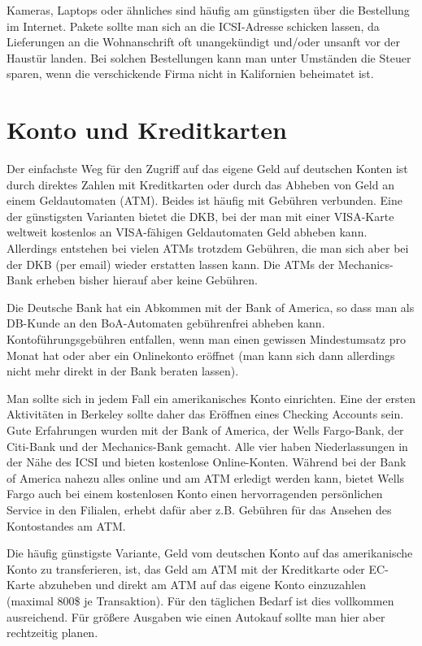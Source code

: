 \documentclass[a4paper]{scrreprt}
\begin{document}
Kameras, Laptops oder ähnliches sind häufig am günstigsten über die
Bestellung im Internet. Pakete sollte man sich an die ICSI-Adresse
schicken lassen, da Lieferungen an die Wohnanschrift oft unangekündigt
und/oder unsanft vor der Haustür landen. Bei solchen Bestellungen kann
man unter Umständen die Steuer sparen, wenn die verschickende Firma
nicht in Kalifornien beheimatet ist.


\section{Konto und Kreditkarten}

Der einfachste Weg für den Zugriff auf das eigene Geld auf deutschen Konten ist durch direktes Zahlen mit Kreditkarten oder durch das Abheben von Geld an einem Geldautomaten (ATM). Beides ist häufig mit Gebühren verbunden. Eine der günstigsten Varianten bietet die DKB, bei der man mit einer VISA-Karte weltweit kostenlos an VISA-fähigen Geldautomaten Geld abheben kann. Allerdings entstehen bei vielen ATMs trotzdem Gebühren, die man sich aber bei der DKB (per email) wieder erstatten lassen kann. Die ATMs der Mechanics-Bank erheben bisher hierauf aber keine Gebühren.

Die Deutsche Bank hat ein Abkommen mit der Bank of America, so dass man als DB-Kunde an den BoA-Automaten gebührenfrei abheben kann. Kontoführungsgebühren entfallen, wenn man einen gewissen Mindestumsatz pro Monat hat oder aber ein Onlinekonto eröffnet (man kann sich dann allerdings nicht mehr direkt in der Bank beraten lassen).

Man sollte sich in jedem Fall ein amerikanisches Konto einrichten. Eine der ersten Aktivitäten in Berkeley sollte daher das Eröffnen eines Checking Accounts sein. Gute Erfahrungen wurden mit der Bank of America, der Wells Fargo-Bank, der Citi-Bank und der Mechanics-Bank gemacht. Alle vier haben Niederlassungen in der Nähe des ICSI und bieten kostenlose Online-Konten. Während bei der Bank of America nahezu alles online und am ATM erledigt werden kann, bietet Wells Fargo auch bei einem kostenlosen Konto einen hervorragenden persönlichen Service in den Filialen, erhebt dafür aber z.B. Gebühren für das Ansehen des Kontostandes am ATM.

Die häufig günstigste Variante, Geld vom deutschen Konto auf das amerikanische Konto zu transferieren, ist, das Geld am ATM mit der Kreditkarte oder EC-Karte abzuheben und direkt am ATM auf das eigene Konto einzuzahlen (maximal 800\$ je Transaktion). Für den täglichen Bedarf ist dies vollkommen ausreichend. Für größere Ausgaben wie einen Autokauf sollte man hier aber rechtzeitig planen.
\end{document}
